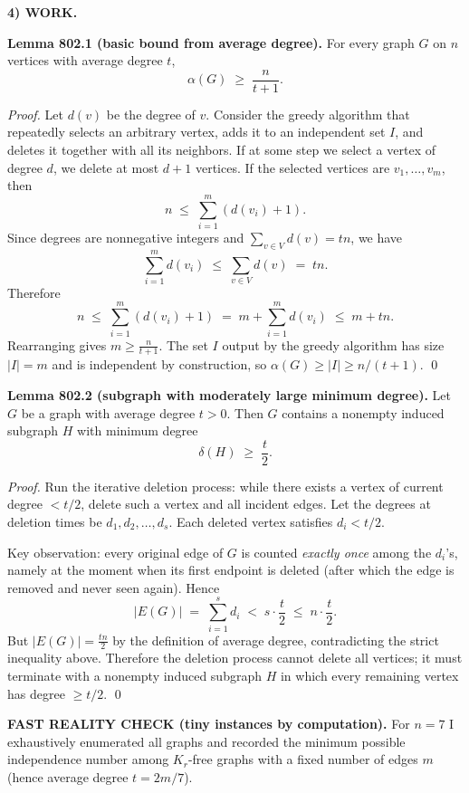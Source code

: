 \medskip
\noindent\textbf{4) WORK.}

\textbf{Lemma 802.1 (basic bound from average degree).}
For every graph $G$ on $n$ vertices with average degree $t$,
\[
\alpha(G)\;\ge\;\frac{n}{t+1}.
\]

\emph{Proof.}
Let $d(v)$ be the degree of $v$. Consider the greedy algorithm that repeatedly selects an arbitrary vertex, adds it to an independent set $I$, and deletes it together with all its neighbors. If at some step we select a vertex of degree $d$, we delete at most $d+1$ vertices. If the selected vertices are $v_1,\dots,v_m$, then
\[
 n\;\le\;\sum_{i=1}^m (d(v_i)+1).
\]
Since degrees are nonnegative integers and $\sum_{v\in V} d(v)=tn$, we have
\[
\sum_{i=1}^m d(v_i)\;\le\;\sum_{v\in V} d(v)\;=\;tn.
\]
Therefore
\[
 n\;\le\;\sum_{i=1}^m (d(v_i)+1)\;=\;m+\sum_{i=1}^m d(v_i)\;\le\;m+tn.
\]
Rearranging gives $m\ge \frac{n}{t+1}$. The set $I$ output by the greedy algorithm has size $|I|=m$ and is independent by construction, so $\alpha(G)\ge |I|\ge n/(t+1)$.
\qed

\textbf{Lemma 802.2 (subgraph with moderately large minimum degree).}
Let $G$ be a graph with average degree $t>0$. Then $G$ contains a nonempty induced subgraph $H$ with minimum degree
\[
\delta(H)\;\ge\;\frac{t}{2}.
\]

\emph{Proof.}
Run the iterative deletion process: while there exists a vertex of current degree $<t/2$, delete such a vertex and all incident edges. Let the degrees at deletion times be $d_1,d_2,\dots,d_s$.
Each deleted vertex satisfies $d_i<t/2$.

Key observation: every original edge of $G$ is counted \emph{exactly once} among the $d_i$'s, namely at the moment when its first endpoint is deleted (after which the edge is removed and never seen again). Hence
\[
|E(G)|\;=\;\sum_{i=1}^s d_i\;<\; s\cdot \frac{t}{2}\;\le\; n\cdot \frac{t}{2}.
\]
But $|E(G)|=\frac{tn}{2}$ by the definition of average degree, contradicting the strict inequality above.
Therefore the deletion process cannot delete all vertices; it must terminate with a nonempty induced subgraph $H$ in which every remaining vertex has degree $\ge t/2$.
\qed

\textbf{FAST REALITY CHECK (tiny instances by computation).}
For $n=7$ I exhaustively enumerated all graphs and recorded the minimum possible independence number among $K_r$-free graphs with a fixed number of edges $m$ (hence average degree $t=2m/7$).

